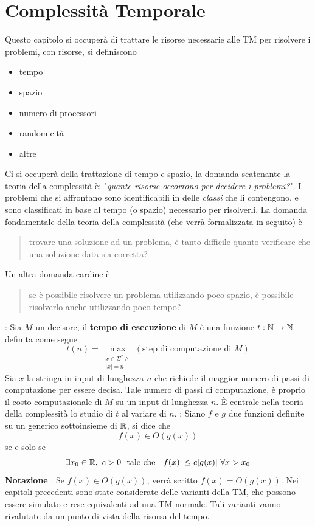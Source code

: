 \documentclass[10pt, letterpaper]{report}
\begin{document}
\chapter{Complessità Temporale}
Questo capitolo si occuperà di trattare le risorse necessarie alle TM per risolvere i problemi, con risorse, si definiscono \begin{itemize}
    \item tempo 
    \item spazio 
    \item numero di processori 
    \item randomicità 
    \item altre
\end{itemize}
Ci si occuperà della trattazione di tempo e spazio, la domanda scatenante la teoria della complessità è: "\textit{quante risorse occorrono per decidere i problemi?}".\acc 
I problemi che si affrontano sono identificabili in delle \textit{classi} che li contengono, e sono classificati in base al tempo (o spazio) necessario per risolverli. La domanda fondamentale della teoria della complessità (che verrà formalizzata in seguito) è \begin{quote}
    trovare una soluzione ad un problema, è tanto difficile quanto verificare che una soluzione data sia corretta?
\end{quote}
Un altra domanda cardine è\begin{quote}
    se è possibile risolvere un problema utilizzando poco spazio, è possibile risolverlo anche utilizzando poco tempo?
\end{quote}
 : Sia $M$ un decisore, il \textbf{tempo di esecuzione} di $M$ è una funzione $t:{\mathbb N}\rightarrow {\mathbb N}$ definita come segue 
$$ t(n)=\max_{\begin{matrix}x\in\Sigma^* \land \\ |x|=n\end{matrix}}(\text{step di computazione di }M)$$
Sia $x$ la stringa in input di lunghezza $n$ che richiede il maggior numero di passi di computazione per essere decisa. Tale numero di passi di computazione, è proprio il costo computazionale di $M$ su un input di lunghezza $n$. È centrale nella teoria della complessità lo studio di $t$ al variare di $n$.\acc 
{} : Siano $f$ e $g$ due funzioni definite su un generico sottoinsieme di ${\mathbb R}$, si dice che $$ f(x)\in O(g(x))$$ 
se e solo se 
$$ \exists x_0\in \R,\ c>0 \ \text{ tale che } \ |f(x)|\le c|g(x)| \ \forall x>x_0$$
\textbf{Notazione} : Se $f(x)\in O(g(x))$, verrà scritto $f(x)=O(g(x))$.\acc 
Nei capitoli precedenti sono state considerate delle varianti della TM, che possono essere simulato e rese equivalenti ad una TM normale. Tali varianti vanno rivalutate da un punto di vista della risorsa del tempo. 
\end{document}
